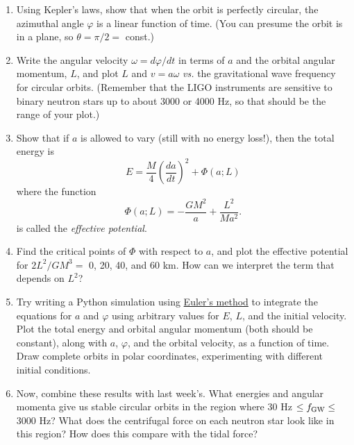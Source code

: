 \documentclass[11pt]{article}
\begin{document}
\begin{enumerate}

\item Using Kepler's laws, show that when the orbit is perfectly circular, the azimuthal angle $\varphi$ is a linear function of time. (You can presume the orbit is in a plane, so $\theta = \pi/2 =$ const.)

\item Write the angular velocity $\omega = d\varphi/dt$ in terms of $a$ and the orbital angular momentum, $L$, and plot $L$ and $v=a\omega$ \textit{vs.} the gravitational wave frequency for circular orbits. (Remember that the LIGO instruments are sensitive to binary neutron stars up to about 3000 or 4000 Hz, so that should be the range of your plot.)

\item Show that if $a$ is allowed to vary (still with no energy loss!), then the total energy is
\begin{equation}
E = \frac{M}{4}\left(\frac{da}{dt}\right)^2 + \Phi(a; L)
\end{equation}
where the function
\begin{equation}
\Phi(a; L) = - \frac{GM^2}{a} + \frac{L^2}{Ma^2}.
\end{equation}
is called the \textit{effective potential}.

\item Find the critical points of $\Phi$ with respect to $a$, and plot the effective potential for $2L^2/GM^3 =$ 0, 20, 40, and 60 km. How can we interpret the term that depends on $L^2$?

\item Try writing a Python simulation using \href{https://en.wikipedia.org/wiki/Euler_method}{Euler's method} to integrate the equations for $a$ and $\varphi$ using arbitrary values for $E$, $L$, and the initial velocity. Plot the total energy and orbital angular momentum (both should be constant), along with $a$, $\varphi$, and the orbital velocity, as a function of time. Draw complete orbits in polar coordinates, experimenting with different initial conditions.

\item Now, combine these results with last week's. What energies and angular momenta give us stable circular orbits in the region where 30 Hz $\leq f_{\rm GW} \leq$ 3000 Hz? What does the centrifugal force on each neutron star look like in this region? How does this compare with the tidal force?

\end{enumerate}
\end{document}

